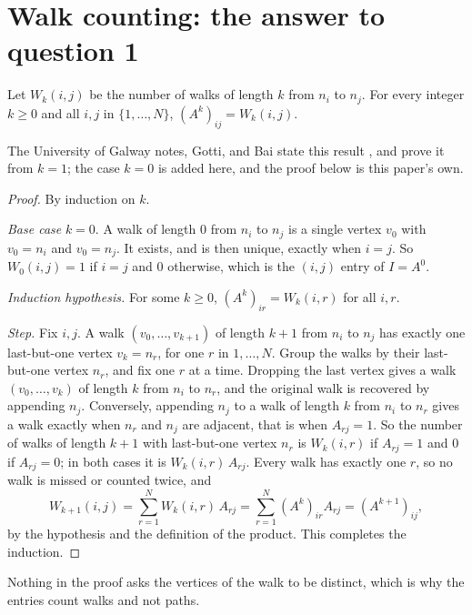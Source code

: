 \section{Walk counting: the answer to question 1}\label{sec:walks}

\begin{theorem}\label{thm:walks}
Let $W_k(i,j)$ be the number of walks of length $k$ from $n_i$ to $n_j$. For every integer $k \ge 0$ and all $i, j$ in $\{1, \dots, N\}$, $(A^k)_{ij} = W_k(i,j)$.
\end{theorem}

The University of Galway notes, Gotti, and Bai state this result \cite[Theorem 1.1.3, p.~4]{galway_adjacency_notes} \cite[Proposition 2, p.~1]{gotti_18211_lecture27} \cite[Theorem 1, p.~1]{bai_bimsa_adjacency}, and prove it from $k = 1$; the case $k = 0$ is added here, and the proof below is this paper's own.

\begin{proof}
By induction on $k$.

\emph{Base case} $k = 0$. A walk of length $0$ from $n_i$ to $n_j$ is a single vertex $v_0$ with $v_0 = n_i$ and $v_0 = n_j$. It exists, and is then unique, exactly when $i = j$. So $W_0(i,j) = 1$ if $i = j$ and $0$ otherwise, which is the $(i,j)$ entry of $I = A^0$.

\emph{Induction hypothesis.} For some $k \ge 0$, $(A^k)_{ir} = W_k(i,r)$ for all $i, r$.

\emph{Step.} Fix $i, j$. A walk $(v_0, \dots, v_{k+1})$ of length $k+1$ from $n_i$ to $n_j$ has exactly one last-but-one vertex $v_k = n_r$, for one $r$ in $1, \dots, N$. Group the walks by their last-but-one vertex $n_r$, and fix one $r$ at a time. Dropping the last vertex gives a walk $(v_0, \dots, v_k)$ of length $k$ from $n_i$ to $n_r$, and the original walk is recovered by appending $n_j$. Conversely, appending $n_j$ to a walk of length $k$ from $n_i$ to $n_r$ gives a walk exactly when $n_r$ and $n_j$ are adjacent, that is when $A_{rj} = 1$. So the number of walks of length $k+1$ with last-but-one vertex $n_r$ is $W_k(i,r)$ if $A_{rj} = 1$ and $0$ if $A_{rj} = 0$; in both cases it is $W_k(i,r)\,A_{rj}$. Every walk has exactly one $r$, so no walk is missed or counted twice, and
\[
W_{k+1}(i,j) = \sum_{r=1}^{N} W_k(i,r)\,A_{rj} = \sum_{r=1}^{N} (A^k)_{ir} A_{rj} = (A^{k+1})_{ij},
\]
by the hypothesis and the definition of the product. This completes the induction.
\end{proof}

Nothing in the proof asks the vertices of the walk to be distinct, which is why the entries count walks and not paths.

